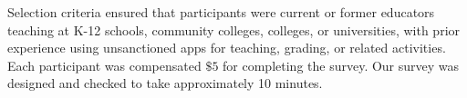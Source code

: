 Selection criteria ensured that participants were current or former educators teaching at K-12 schools, community colleges, colleges, or universities, with prior experience using unsanctioned apps for teaching, grading, or related activities. 
Each participant was compensated $\$5$ for completing the survey. Our survey was designed and checked to take approximately 10 minutes. %



 


